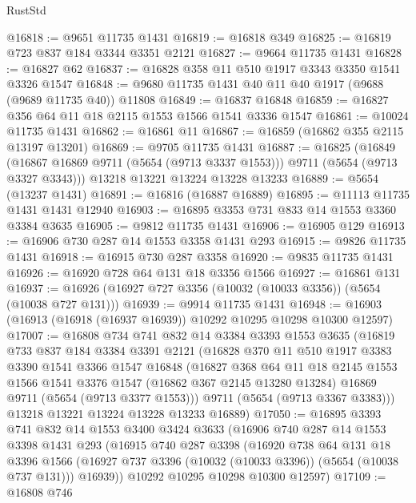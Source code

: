 \begin{lexlean}{RustStd}
\begin{coremodule}
@16818 := @9651 @11735 @1431
@16819 := @16818 @349
@16825 := @16819 @723 @837 @184 @3344 @3351 @2121
@16827 := @9664 @11735 @1431
@16828 := @16827 @62
@16837 := @16828 @358 @11 @510 @1917 @3343 @3350 @1541 @3326 @1547
@16848 := @9680 @11735 @1431 @40 @11 @40 @1917 (@9688 (@9689 @11735 @40)) @11808
@16849 := @16837 @16848
@16859 := @16827 @356 @64 @11 @18 @2115 @1553 @1566 @1541 @3336 @1547
@16861 := @10024 @11735 @1431
@16862 := @16861 @11
@16867 := @16859 (@16862 @355 @2115 @13197 @13201)
@16869 := @9705 @11735 @1431
@16887 := @16825
    (@16849 (@16867 @16869 @9711 (@5654 (@9713 @3337 @1553))) @9711 (@5654 (@9713 @3327 @3343)))
    @13218
    @13221
    @13224
    @13228
    @13233
@16889 := @5654 (@13237 @1431)
@16891 := @16816 (@16887 @16889)
@16895 := @11113 @11735 @1431 @1431 @12940
@16903 := @16895 @3353 @731 @833 @14 @1553 @3360 @3384 @3635
@16905 := @9812 @11735 @1431
@16906 := @16905 @129
@16913 := @16906 @730 @287 @14 @1553 @3358 @1431 @293
@16915 := @9826 @11735 @1431
@16918 := @16915 @730 @287 @3358
@16920 := @9835 @11735 @1431
@16926 := @16920 @728 @64 @131 @18 @3356 @1566
@16927 := @16861 @131
@16937 := @16926 (@16927 @727 @3356 (@10032 (@10033 @3356)) (@5654 (@10038 @727 @131)))
@16939 := @9914 @11735 @1431
@16948 := @16903 (@16913 (@16918 (@16937 @16939)) @10292 @10295 @10298 @10300 @12597)
@17007 := @16808
    @734
    @741
    @832
    @14
    @3384
    @3393
    @1553
    @3635
    (@16819
      @733
      @837
      @184
      @3384
      @3391
      @2121
      (@16828
        @370
        @11
        @510
        @1917
        @3383
        @3390
        @1541
        @3366
        @1547
        @16848
        (@16827
          @368
          @64
          @11
          @18
          @2145
          @1553
          @1566
          @1541
          @3376
          @1547
          (@16862 @367 @2145 @13280 @13284)
          @16869
          @9711
          (@5654 (@9713 @3377 @1553)))
        @9711
        (@5654 (@9713 @3367 @3383)))
      @13218
      @13221
      @13224
      @13228
      @13233
      @16889)
@17050 := @16895
    @3393
    @741
    @832
    @14
    @1553
    @3400
    @3424
    @3633
    (@16906
      @740
      @287
      @14
      @1553
      @3398
      @1431
      @293
      (@16915
        @740
        @287
        @3398
        (@16920
          @738
          @64
          @131
          @18
          @3396
          @1566
          (@16927 @737 @3396 (@10032 (@10033 @3396)) (@5654 (@10038 @737 @131)))
          @16939))
      @10292
      @10295
      @10298
      @10300
      @12597)
@17109 := @16808
    @746

\end{coremodule}
\end{lexlean}
